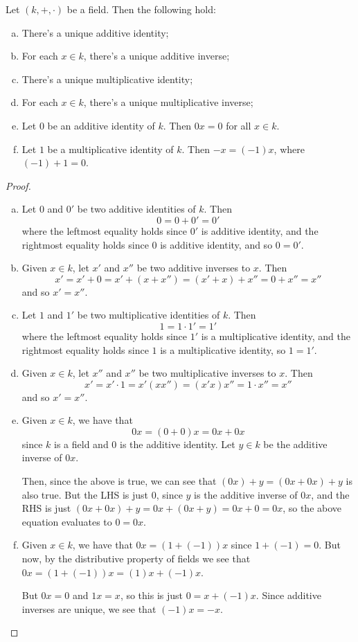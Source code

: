 \begin{lemma}
	Let $(k,+,\cdot)$ be a field. Then the following hold:
	\begin{enumerate}[(a)]
		\item There's a unique additive identity;
		\item For each $x\in k$, there's a unique additive inverse;
		\item There's a unique multiplicative identity;
		\item For each $x\in k$, there's a unique multiplicative inverse;
		\item Let $0$ be an additive identity of $k$. Then $0x=0$ for all $x\in k$.
		\item Let $1$ be a multiplicative identity of $k$. Then $-x=(-1)x$, where $(-1)+1=0$.
	\end{enumerate}
\end{lemma}
\begin{proof}
	\begin{enumerate}[(a)]
		\item Let $0$ and $0'$ be two additive identities of $k$. Then
		\[0=0+0'=0'\]where the leftmost equality holds since $0'$ is additive identity, and the rightmost equality holds since $0$ is additive identity, and so $0=0'$.
		
		\item Given $x\in k$, let $x'$ and $x''$ be two additive inverses to $x$. Then
		\[x'=x'+0=x'+(x+x'')=(x'+x)+x''=0+x''=x''\]and so $x'=x''$.
		
		\item Let $1$ and $1'$ be two multiplicative identities of $k$. Then
		\[1=1\cdot1'=1'\]where the leftmost equality holds since $1'$ is a multiplicative identity, and the rightmost equality holds since $1$ is a multiplicative identity, so $1=1'$.
		
		\item Given $x\in k$, let $x''$ and $x''$ be two multiplicative inverses to $x$. Then
		\[x'=x'\cdot1=x'(xx'')=(x'x)x''=1\cdot x''=x''\]and so $x'=x''$.
		
		\item Given $x\in k$, we have that
		\[0x=(0+0)x=0x+0x\]since $k$ is a field and $0$ is the additive identity. Let $y\in k$ be the additive inverse of $0x$.
		
		Then, since the above is true, we can see that $(0x)+y=(0x+0x)+y$ is also true. But the LHS is just 0, since $y$ is the additive inverse of $0x$, and the RHS is just $(0x+0x)+y=0x+(0x+y)=0x+0=0x$, so the above equation evaluates to $0=0x$.
		
		\item Given $x\in k$, we have that $0x=(1+(-1))x$ since $1+(-1)=0$. But now, by the distributive property of fields we see that $0x=(1+(-1))x=(1)x+(-1)x$.
		
		But $0x=0$ and $1x=x$, so this is just $0=x+(-1)x$. Since additive inverses are unique, we see that $(-1)x=-x$.
	\end{enumerate}
\end{proof}

